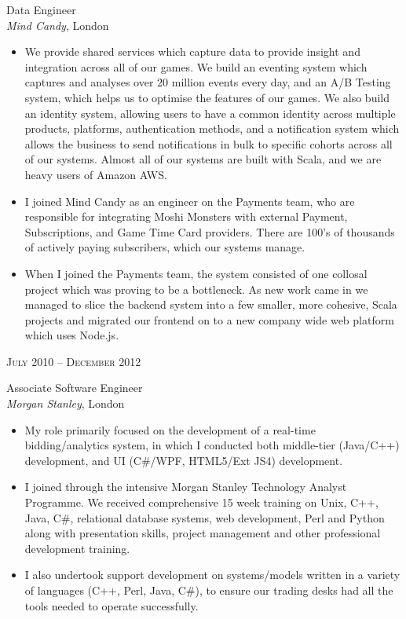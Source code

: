 \documentclass[10pt]{article} %
\begin{document}
{\begin{minipage}[t]{0.5\textwidth}
{\raggedright\large Data Engineer\\
\textit{Mind Candy}, London\\[5pt]}

\normalsize{
\begin{itemize}
\item We provide shared services which capture data to provide insight and integration across all of our games. We build an eventing system which captures and analyses over 20 million events every day, and an A/B Testing system, which helps us to optimise the features of our games. We also build an identity system, allowing users to have a common identity across multiple products, platforms, authentication methods, and a notification system which allows the business to send notifications in bulk to specific cohorts across all of our systems. Almost all of our systems are built with Scala, and we are heavy users of Amazon AWS.
\item I joined Mind Candy as an engineer on the Payments team, who are responsible for integrating Moshi Monsters with external Payment, Subscriptions, and Game Time Card providers. There are 100's of thousands of actively paying subscribers, which our systems manage.
\item When I joined the Payments team, the system consisted of one collosal project which was proving to be a bottleneck. As new work came in we managed to slice the backend system into a few smaller, more cohesive, Scala projects and migrated our frontend on to a new company wide web platform which uses Node.js.
\end{itemize}}


{\raggedleft\textsc{July 2010 -- December 2012}\par}

{\raggedright\large Associate Software Engineer\\
\textit{Morgan Stanley}, London\\[5pt]}

\normalsize{
\begin{itemize}
	\item My role primarily focused on the development of a real-time bidding/analytics system, in which I conducted both middle-tier (Java/C++) development, and UI (C\#/WPF, HTML5/Ext JS4) development.
	\item I joined through the intensive Morgan Stanley Technology Analyst Programme. We received comprehensive 15 week training on Unix, C++, Java, C\#, relational database systems, web development, Perl and Python along with presentation skills, project management and other professional development training.
	\item I also undertook support development on systems/models written in a variety of languages (C++, Perl, Java, C\#), to ensure our trading desks had all the tools needed to operate successfully.
\end{itemize}}


\end{minipage}}
\end{document}
